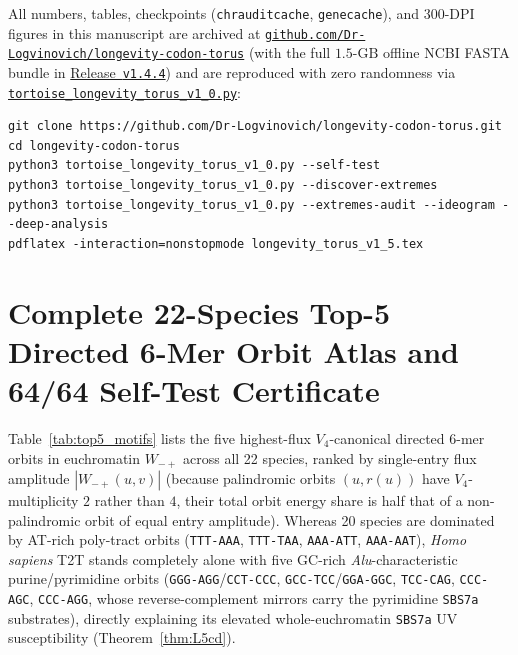 \documentclass[11pt,a4paper]{article}
\renewcommand{\_}{\origunderscore\penalty200\relax}
\theoremstyle{remark}
\begin{document}
All numbers, tables, checkpoints (\texttt{chr\_audit\_cache}, \texttt{gene\_cache}), and 300-DPI figures in this manuscript are archived at \href{https://github.com/Dr-Logvinovich/longevity-codon-torus}{\nolinkurl{github.com/Dr-Logvinovich/longevity-codon-torus}} (with the full $1.5\text{-GB}$ offline NCBI FASTA bundle in \href{https://github.com/Dr-Logvinovich/longevity-codon-torus/releases/tag/v1.4.4}{Release~\texttt{v1.4.4}}) and are reproduced with zero randomness via \href{https://github.com/Dr-Logvinovich/longevity-codon-torus/blob/main/tortoise_longevity_torus_v1_0.py}{\nolinkurl{tortoise_longevity_torus_v1_0.py}}:
{\small
\begin{verbatim}
git clone https://github.com/Dr-Logvinovich/longevity-codon-torus.git
cd longevity-codon-torus
python3 tortoise_longevity_torus_v1_0.py --self-test
python3 tortoise_longevity_torus_v1_0.py --discover-extremes
python3 tortoise_longevity_torus_v1_0.py --extremes-audit --ideogram --deep-analysis
pdflatex -interaction=nonstopmode longevity_torus_v1_5.tex
\end{verbatim}
}

\appendix
\section{Complete 22-Species Top-5 Directed 6-Mer Orbit Atlas and 64/64 Self-Test Certificate}
\label{app:motifs}
Table~\ref{tab:top5_motifs} lists the five highest-flux $V_4$-canonical directed 6-mer orbits in euchromatin $W_{-+}$ across all 22 species, ranked by single-entry flux amplitude $|W_{-+}(u,v)|$ (because palindromic orbits $(u, r(u))$ have $V_4$-multiplicity $2$ rather than $4$, their total orbit energy share is half that of a non-palindromic orbit of equal entry amplitude). Whereas 20 species are dominated by AT-rich poly-tract orbits (\texttt{TTT-AAA}, \texttt{TTT-TAA}, \texttt{AAA-ATT}, \texttt{AAA-AAT}), \textit{Homo sapiens} T2T stands completely alone with five GC-rich \textit{Alu}-characteristic purine/pyrimidine orbits (\texttt{GGG-AGG}\slash\texttt{CCT-CCC}, \texttt{GCC-TCC}\slash\texttt{GGA-GGC}, \texttt{TCC-CAG}, \texttt{CCC-AGC}, \texttt{CCC-AGG}, whose reverse-complement mirrors carry the pyrimidine \texttt{SBS7a} substrates), directly explaining its elevated whole-euchromatin \texttt{SBS7a} UV susceptibility (Theorem~\ref{thm:L5cd}).
\end{document}
